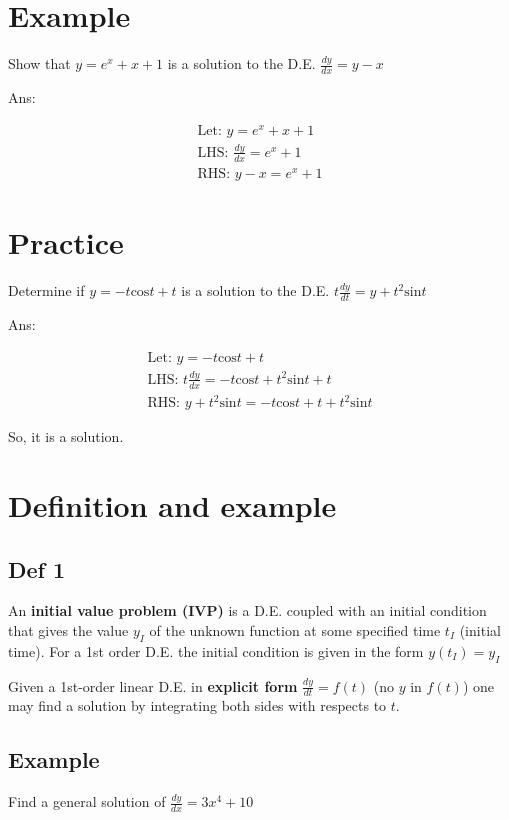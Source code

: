 \documentclass{article}
\begin{document}
\section{Example}
Show that $y = e^x + x + 1$ is a solution to the D.E. $\frac{dy}{dx} = y - x$

Ans: 

$$
\begin{aligned}
\text{Let: } y = e^x + x + 1 \\
\text{LHS: } \frac{dy}{dx} = e^x + 1 \\
\text{RHS: } y - x = e^x + 1
\end{aligned}
$$

\section{Practice}
Determine if $y = -t\mathrm{cos}t + t$ is a solution to the D.E. $t\frac{dy}{dt} = y + t^2\mathrm{sin}t$

Ans:

$$
\begin{aligned}
\text{Let: } y = -t\mathrm{cos}t + t\\
\text{LHS: } t\frac{dy}{dx} = -t\mathrm{cos}t + t^2\mathrm{sin}t + t \\
\text{RHS: } y + t^2\mathrm{sin}t = -t\mathrm{cos}t + t + t^2\mathrm{sin}t
\end{aligned}
$$

So, it is a solution.

\section{Definition and example}
\subsection{Def 1}
An \textbf{initial value problem (IVP)} is a D.E. coupled with an initial condition that gives the value $y_I$ of the unknown function at some specified time $t_I$ (initial time). For a 1st order D.E. the initial condition is given in the form $y(t_I) = y_I$

Given a 1st-order linear D.E. in \textbf{explicit form} $\frac{dy}{dt} = f(t)$ (no $y$ in $f(t)$) one may find a solution by integrating both sides with respects to $t$.

\subsection{Example}
Find a general solution of $\frac{dy}{dx} = 3x^4 + 10$
\end{document}

